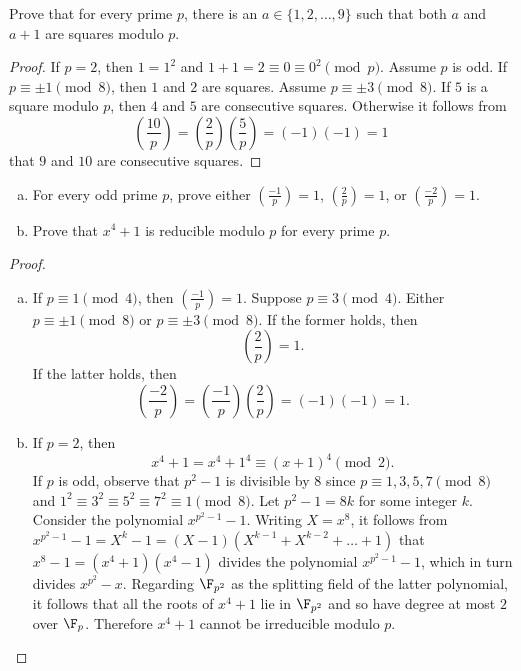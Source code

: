 \documentclass[10pt]{amsart}
\begin{document}
\begin{thm}
  Prove that for every prime $p$, there is an $a \in \{1,2,\ldots,9\}$ such that both $a$ and $a + 1$ are squares modulo $p$.

  \begin{proof}
    If $p = 2$, then $1 = 1^2$ and $1 + 1 = 2 \equiv 0 \equiv 0^2 \pmod{p}$.
    Assume $p$ is odd.
    If $p \equiv \pm 1 \pmod{8}$, then $1$ and $2$ are squares.
    Assume $p \equiv \pm 3 \pmod{8}$.
    If $5$ is a square modulo $p$, then $4$ and $5$ are consecutive squares.
    Otherwise it follows from
    $$\left(\frac{10}{p}\right) = \left(\frac{2}{p}\right)\left(\frac{5}{p}\right) = (-1)(-1) = 1$$
    that $9$ and $10$ are consecutive squares.
  \end{proof}
\end{thm}

\begin{thm}
  \begin{enumerate}[(a)]
  \item
    For every odd prime $p$, prove either $\left(\frac{-1}{p}\right) = 1$, $\left(\frac{2}{p}\right) = 1$, or $\left(\frac{-2}{p}\right) = 1$.
  \item
    Prove that $x^4 + 1$ is reducible modulo $p$ for every prime $p$.
  \end{enumerate}

  \begin{proof}
    \begin{enumerate}[(a)]
    \item
      If $p \equiv 1 \pmod{4}$, then $\left(\frac{-1}{p}\right) = 1$.
      Suppose $p \equiv 3 \pmod{4}$.
      Either $p \equiv \pm 1 \pmod{8}$ or $p \equiv \pm 3 \pmod{8}$.
      If the former holds, then
      $$\left(\frac{2}{p}\right) = 1.$$
      If the latter holds, then
      $$\left(\frac{-2}{p}\right) = \left(\frac{-1}{p}\right)\left(\frac{2}{p}\right) = (-1)(-1) = 1.$$
    \item
      If $p = 2$, then 
        $$x^4 + 1 = x^4 + 1^4 \equiv (x + 1)^4 \pmod{2}.$$
        If $p$ is odd, observe that $p^2 - 1$ is divisible by 8 since $p \equiv 1, 3, 5, 7 \pmod{8}$ and $1^2 \equiv 3^2 \equiv 5^2 \equiv 7^2 \equiv 1 \pmod{8}$.
        Let $p^2 - 1 = 8k$ for some integer $k$.
        Consider the polynomial $x^{p^2 - 1} - 1$.
        Writing $X = x^8$, it follows from $x^{p^2 - 1} - 1 = X^k - 1 = (X - 1)(X^{k - 1} + X^{k - 2} + \ldots + 1)$ that $x^8 - 1 = (x^4 + 1)(x^4 - 1)$ divides the polynomial $x^{p^2 - 1} - 1$, which in turn divides $x^{p^2} - x$.
        Regarding $\F_{p^2}$ as the splitting field of the latter polynomial, it follows that all the roots of $x^4 + 1$ lie in $\F_{p^2}$ and so have degree at most $2$ over $\F_p$.
        Therefore $x^4 + 1$ cannot be irreducible modulo $p$.
    \end{enumerate}
  \end{proof}
\end{thm}
\end{document}
